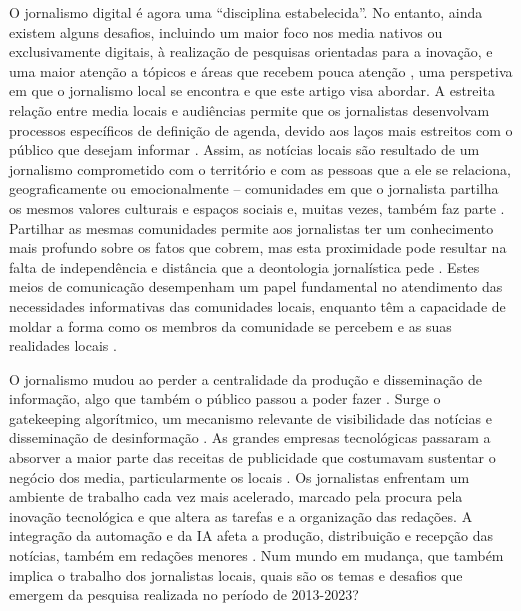 \documentclass[portuguese]{textolivre}
\begin{document}
O jornalismo digital é agora uma “disciplina estabelecida”. No entanto, ainda existem alguns desafios, incluindo um maior foco nos media nativos ou exclusivamente digitais, à realização de pesquisas orientadas para a inovação, e uma maior atenção a tópicos e áreas que recebem pouca atenção \cite{salaverria2019}, uma perspetiva em que o jornalismo local se encontra e que este artigo visa abordar. A estreita relação entre media locais e audiências permite que os jornalistas desenvolvam processos específicos de definição de agenda, devido aos laços mais estreitos com o público que desejam informar \cite{correia2019fake}. Assim, as notícias locais são resultado de um jornalismo comprometido com o território e com as pessoas que a ele se relaciona, geograficamente ou emocionalmente – comunidades em que o jornalista partilha os mesmos valores culturais e espaços sociais e, muitas vezes, também faz parte \cite{camponez2002, lopez-garcia2008}. Partilhar as mesmas comunidades permite aos jornalistas ter um conhecimento mais profundo sobre os fatos que cobrem, mas esta proximidade pode resultar na falta de independência e distância que a deontologia jornalística pede \cite{jeronimo2015}. Estes meios de comunicação desempenham um papel fundamental no atendimento das necessidades informativas das comunidades locais, enquanto têm a capacidade de moldar a forma como os membros da comunidade se percebem e as suas realidades locais \cite{nielsen2015}.

O jornalismo mudou ao perder a centralidade da produção e disseminação de informação, algo que também o público passou a poder fazer \cite{castells2015}. Surge o gatekeeping algorítmico, um mecanismo relevante de visibilidade das notícias e disseminação de desinformação \cite{cardoso2023}. As grandes empresas tecnológicas passaram a absorver a maior parte das receitas de publicidade que costumavam sustentar o negócio dos media, particularmente os locais \cite{costa2014}. Os jornalistas enfrentam um ambiente de trabalho cada vez mais acelerado, marcado pela procura pela inovação tecnológica e que altera as tarefas e a organização das redações. A integração da automação e da IA afeta a produção, distribuição e recepção das notícias, também em redações menores \cite{goncalves2024}. Num mundo em mudança, que também implica o trabalho dos jornalistas locais, quais são os temas e desafios que emergem da pesquisa realizada no período de 2013-2023?
\end{document}
